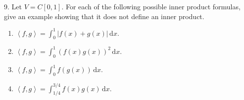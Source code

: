 \documentclass{article}
\begin{document}
9. Let $V = C[0, 1]$. For each of the following possible inner product formulas, give an example showing that it does not define an inner product.

\begin{enumerate}

	\item $\displaystyle \left< f, g \right> = \int_0^1 |f(x) + g(x)|\,\mathrm{d} x.$

	\item $\displaystyle \left< f, g \right> = \int_0^1 (f(x)g(x))^2\,\mathrm{d} x.$

	\item $\displaystyle \left< f, g \right> = \int_0^1 f(g(x))\,\mathrm{d} x.$

	\item $\displaystyle \left< f, g \right> = \int_{1/4}^{3/4} f(x)g(x)\,\mathrm{d} x.$

\end{enumerate}
\end{document}
